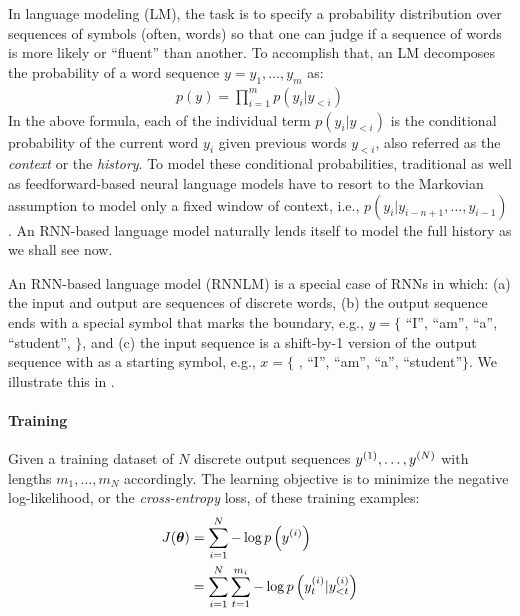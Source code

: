 In language modeling (LM), the task is to specify a probability distribution over
sequences of symbols (often, words) so that one can judge if a sequence of
words is more likely or ``fluent'' than another. To accomplish that, an LM decomposes the
probability of a word sequence $y = y_1, \ldots,
y_m$ as:
\begin{align}
p(y) = \prod_{i=1}^m p(y_i | y_{<i}) %
\end{align}
In the above formula, each of the
individual term $p(y_i | y_{<i})$ is the conditional probability of the current
word $y_i$ given previous words $y_{<i}$, also referred as the {\it
context} or the {\it history}. To model these conditional probabilities, traditional \ngram{}
as well as feedforward-based neural language models have to resort to the
Markovian assumption to model only a fixed window of context, i.e., $p(y_i |
y_{i-n+1}, \ldots, y_{i-1})$. An RNN-based language model naturally lends itself to model the full
history as we shall see now.

An RNN-based language model (RNNLM) is a special case of RNNs in which: (a) the input and output
are sequences of discrete words, (b) the output sequence ends %
with a special symbol \eos{} that marks the boundary, e.g., $y=\{$ ``I'', ``am'', ``a'',
``student'', \eos$\}$, and (c) the input sequence is a
shift-by-1 version of the output sequence with \sos{} as a starting symbol,
e.g., $x=\{$ \sos, ``I'', ``am'', ``a'',
``student''$\}$. We illustrate this in .

\paragraph{Training}
Given a training dataset of $N$ discrete output sequences $y^{(1)}, \ldots,
y^{(N)}$ with lengths $m_1, \ldots, m_N$ accordingly. The learning objective is
to minimize the negative log-likelihood, or the {\it cross-entropy} loss, of these training examples:
\begin{align}
J(\bm{\theta}) &= \sum_{i=1}^{N} -\log p\left(y^{(i)}\right) \\ 
&= \sum_{i=1}^{N} \sum_{t=1}^{m_i} -\log p\left(y^{(i)}_t |
y^{(i)}_{<t}\right)
\end{align}

